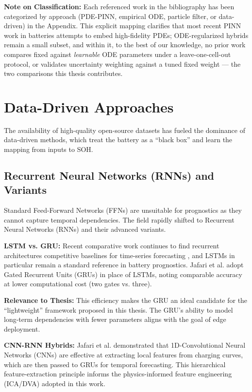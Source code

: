 \textbf{Note on Classification:} Each referenced work in the bibliography has been categorized by approach (PDE-PINN, empirical ODE, particle filter, or data-driven) in the Appendix. This explicit mapping clarifies that most recent PINN work in batteries attempts to embed high-fidelity PDEs; ODE-regularized hybrids remain a small subset, and within it, to the best of our knowledge, no prior work compares fixed against \emph{learnable} ODE parameters under a leave-one-cell-out protocol, or validates uncertainty weighting against a tuned fixed weight --- the two comparisons this thesis contributes.

\section{Data-Driven Approaches}

The availability of high-quality open-source datasets \cite{severson_data} has fueled the dominance of data-driven methods, which treat the battery as a ``black box'' and learn the mapping from inputs to SOH.

\subsection{Recurrent Neural Networks (RNNs) and Variants}

Standard Feed-Forward Networks (FFNs) are unsuitable for prognostics as they cannot capture temporal dependencies. The field rapidly shifted to Recurrent Neural Networks (RNNs) and their advanced variants.

\textbf{LSTM vs. GRU:} Recent comparative work continues to find recurrent architectures competitive baselines for time-series forecasting \cite{zhang_rnn}, and LSTMs \cite{hochreiter_lstm} in particular remain a standard reference in battery prognostics. Jafari et al. \cite{jafari_cnn_gru} adopt Gated Recurrent Units (GRUs) \cite{cho_gru} in place of LSTMs, noting comparable accuracy at lower computational cost (two gates vs. three).

\textbf{Relevance to Thesis:} This efficiency makes the GRU an ideal candidate for the ``lightweight'' framework proposed in this thesis. The GRU's ability to model long-term dependencies with fewer parameters aligns with the goal of edge deployment.

\textbf{CNN-RNN Hybrids:} Jafari et al. \cite{jafari_cnn_gru} demonstrated that 1D-Convolutional Neural Networks (CNNs) are effective at extracting local features from charging curves, which are then passed to GRUs for temporal forecasting. This hierarchical feature-extraction principle informs the physics-informed feature engineering (ICA/DVA) adopted in this work.

